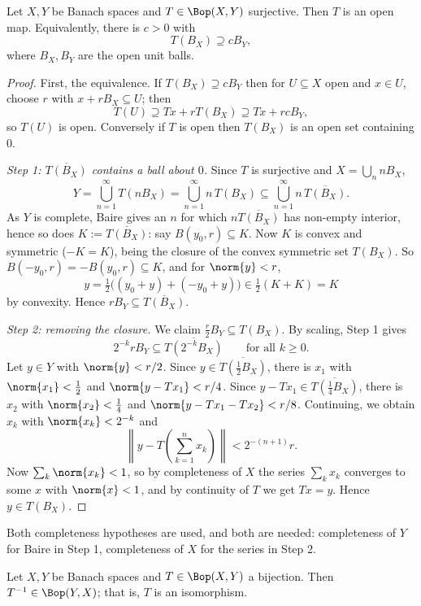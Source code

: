 \begin{theorem}
	Let $X, Y$ be Banach spaces and $T \in \Bop(X,Y)$ surjective. Then $T$ is an open map. Equivalently, there is $c > 0$ with
	$$T(B_X) \supseteq c B_Y,$$
	where $B_X, B_Y$ are the open unit balls.
\end{theorem}

\begin{proof}
	First, the equivalence. If $T(B_X) \supseteq cB_Y$ then for $U \subseteq X$ open and $x \in U$, choose $r$ with $x + rB_X \subseteq U$; then
	$$T(U) \supseteq Tx + rT(B_X) \supseteq Tx + rcB_Y,$$
	so $T(U)$ is open. Conversely if $T$ is open then $T(B_X)$ is an open set containing $0$.

	\emph{Step 1: $\overline{T(B_X)}$ contains a ball about $0$.} Since $T$ is surjective and $X = \bigcup_n nB_X$,
	$$Y = \bigcup_{n=1}^\infty T(nB_X) = \bigcup_{n=1}^\infty n\, T(B_X) \subseteq \bigcup_{n=1}^\infty n\,\overline{T(B_X)}.$$
	As $Y$ is complete, Baire gives an $n$ for which $n\overline{T(B_X)}$ has non-empty interior, hence so does $K := \overline{T(B_X)}$: say $B(y_0, r) \subseteq K$. Now $K$ is convex and symmetric ($-K = K$), being the closure of the convex symmetric set $T(B_X)$. So $B(-y_0,r) = -B(y_0,r) \subseteq K$, and for $\norm{y} < r$,
	$$y = \tfrac12\big((y_0 + y) + (-y_0 + y)\big) \in \tfrac12(K + K) = K$$
	by convexity. Hence $rB_Y \subseteq \overline{T(B_X)}$.

	\emph{Step 2: removing the closure.} We claim $\frac{r}{2}B_Y \subseteq T(B_X)$. By scaling, Step 1 gives
	$$2^{-k} r B_Y \subseteq \overline{T(2^{-k}B_X)} \qquad \text{for all } k \geq 0.$$
	Let $y \in Y$ with $\norm{y} < r/2$. Since $y \in \overline{T(\frac12 B_X)}$, there is $x_1$ with $\norm{x_1} < \frac12$ and $\norm{y - Tx_1} < r/4$. Since $y - Tx_1 \in \overline{T(\frac14 B_X)}$, there is $x_2$ with $\norm{x_2} < \frac14$ and $\norm{y - Tx_1 - Tx_2} < r/8$. Continuing, we obtain $x_k$ with $\norm{x_k} < 2^{-k}$ and
	$$\left\| y - T\left(\sum_{k=1}^n x_k\right) \right\| < 2^{-(n+1)}r.$$
	Now $\sum_k \norm{x_k} < 1$, so by completeness of $X$ the series $\sum_k x_k$ converges to some $x$ with $\norm{x} < 1$, and by continuity of $T$ we get $Tx = y$. Hence $y \in T(B_X)$.
\end{proof}

Both completeness hypotheses are used, and both are needed: completeness of $Y$ for Baire in Step 1, completeness of $X$ for the series in Step 2.

\begin{theorem}
	Let $X, Y$ be Banach spaces and $T \in \Bop(X,Y)$ a bijection. Then $T^{-1} \in \Bop(Y,X)$; that is, $T$ is an isomorphism.
\end{theorem}

